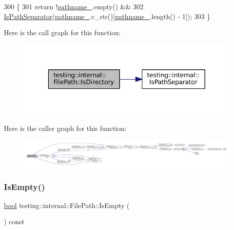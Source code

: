 \begin{DoxyCode}
300                                  \{
301   \textcolor{keywordflow}{return} !\hyperlink{classtesting_1_1internal_1_1FilePath_a12ce28a0015f85604e0372230fa18d6e}{pathname\_}.empty() &&
302          \hyperlink{namespacetesting_1_1internal_a6b8d22cee9edbbfe56077420a6fa1cb1}{IsPathSeparator}(\hyperlink{classtesting_1_1internal_1_1FilePath_a12ce28a0015f85604e0372230fa18d6e}{pathname\_}.c\_str()[\hyperlink{classtesting_1_1internal_1_1FilePath_a12ce28a0015f85604e0372230fa18d6e}{pathname\_}.length() - 1]);
303 \}
\end{DoxyCode}
Here is the call graph for this function\+:
\nopagebreak
\begin{figure}[H]
\begin{center}
\leavevmode
\includegraphics[width=329pt]{classtesting_1_1internal_1_1FilePath_a73fc042ad65e85bbecb956eb4603a6f2_cgraph}
\end{center}
\end{figure}
Here is the caller graph for this function\+:
\nopagebreak
\begin{figure}[H]
\begin{center}
\leavevmode
\includegraphics[width=350pt]{classtesting_1_1internal_1_1FilePath_a73fc042ad65e85bbecb956eb4603a6f2_icgraph}
\end{center}
\end{figure}
\mbox{\label{classtesting_1_1internal_1_1FilePath_a2c165c5510e8705ade547849a9234a6e}} 
\subsubsection{\texorpdfstring{Is\+Empty()}{IsEmpty()}}
{\footnotesize\ttfamily \hyperlink{classbool}{bool} testing\+::internal\+::\+File\+Path\+::\+Is\+Empty (\begin{DoxyParamCaption}{ }\end{DoxyParamCaption}) const\hspace{0.3cm}{\ttfamily [inline]}}




